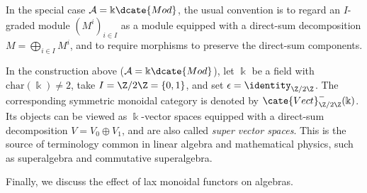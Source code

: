 \begin{convention}
	In the special case $\mathcal{A}=\Bbbk\dcate{Mod}$, the usual convention
	is to regard an $I$-graded module $(M^i)_{i\in I}$ as a module equipped
	with a direct-sum decomposition $M=\bigoplus_{i\in I}M^i$, and to require
	morphisms to preserve the direct-sum components.
\end{convention}

\begin{example}\label{eg:superspace}
	In the construction above ($\mathcal{A}=\Bbbk\dcate{Mod}$), let $\Bbbk$
	be a field with $\mathrm{char}(\Bbbk)\neq2$, take
	$I=\Z/2\Z=\{0,1\}$, and set $\epsilon=\identity_{\Z/2\Z}$. The
	corresponding symmetric monoidal category is denoted by
	$\cate{Vect}^-_{\Z/2\Z}(\Bbbk)$. Its objects can be viewed as
	$\Bbbk$-vector spaces equipped with a direct-sum decomposition
	$V=V_0\oplus V_1$, and are also called \emph{super vector spaces}. This is
	the source of terminology common in linear algebra and mathematical
	physics, such as superalgebra and commutative superalgebra.
\end{example}

Finally, we discuss the effect of lax monoidal functors on algebras.

